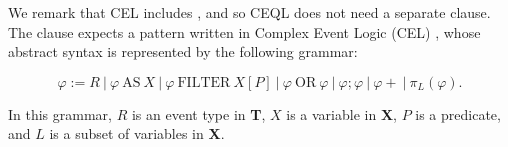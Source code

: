 \vspace{-30pt}
We remark that CEL includes , and so CEQL does not need a separate  clause. The  clause expects a pattern written in Complex Event Logic (CEL) \cite{formal-framework-cer}, whose abstract syntax is represented by the following grammar:

\vspace{-20pt}
\begin{equation*}
  \varphi := R    \ | \ \varphi \ \text{AS} \ X    \ | \    \varphi \ \text{FILTER} \ X[P]  \ | \   \varphi \ \text{OR} \ \varphi   \ | \  \varphi ; \varphi    \ | \  \varphi+ \ | \ \pi_{L}(\varphi).
\end{equation*}

\vspace{-10pt}
In this grammar, $R$ is an event type in \textbf{T}, $X$ is a variable in \textbf{X}, $P$ is a predicate, and $L$ is a subset of variables in \textbf{X}.

